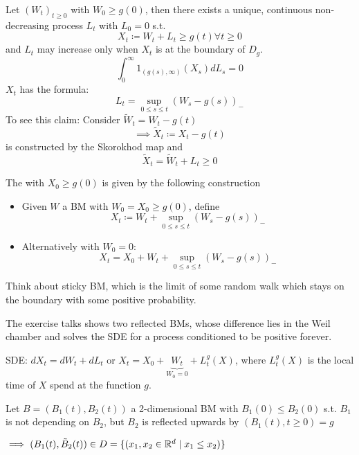 Let $(W_t)_{t\geq 0}$ with $W_0\geq g(0)$, then there exists a unique, continuous non-decreasing process $L_t$ with $L_0=0$ s.t.
\[X_t\coloneqq W_t+L_t\geq g(t)\forall t\geq 0\]
and $L_t$ may increase only when $X_t$ is at the boundary of $D_g$.
\[\int_0^\infty1_{(g(s),\infty)}(X_s)dL_s=0\]
$X_t$ has the formula:
\[L_t=\sup_{0\leq s\leq t}(W_s-g(s))_-\]
To see this claim: Consider $\tilde{W}_t=W_t-g(t)$
\[\implies \tilde{X}_t\coloneqq X_t-g(t)\]
is constructed by the Skorokhod map and \[\tilde{X}_t=\tilde{W}_t+L_t\geq 0\]

\begin{definition}\label{def:3.10}
    The  with $X_0\geq g(0)$ is given by 
    the following construction \begin{itemize}
        \item Given $W$ a BM with $W_0=X_0\geq g(0)$, define \[X_t\coloneqq W_t+\sup_{0\leq s\leq t}(W_s-g(s))_-\]
        \item  Alternatively with $W_0=0:$\[X_t=X_0+W_t+\sup_{0\leq s\leq t}(W_s-g(s))_-\]
    \end{itemize}
\end{definition}

\begin{aremark}
    Think about sticky BM, which is the limit of some random walk which stays on the boundary with some positive probability.

    The exercise talks shows two reflected BMs, whose difference lies in the Weil chamber and solves the SDE for a process conditioned to be positive forever.
\end{aremark}

SDE: $dX_t=dW_t+dL_t$ or $X_t=X_0+\underbrace{W_t}_{W_0=0}+L_t^g(X)$, where 
$L_t^g(X)$ is the local time of $X$ spend at the function $g$.

\begin{aexample}
    Let $B=(B_1(t),B_2(t))$ a 2-dimensional BM with $B_1(0)\leq B_2(0)$ s.t. $B_1$ is not depending on $B_2$, but $B_2$ is reflected upwards by $(B_1(t),t\geq 0)=g$

    $\implies (B_1(t),\tilde{B}_2(t))\in D=\{(x_1,x_2\in\mathbb{R}^d\mid x_1\leq x_2)\}$
\end{aexample}

